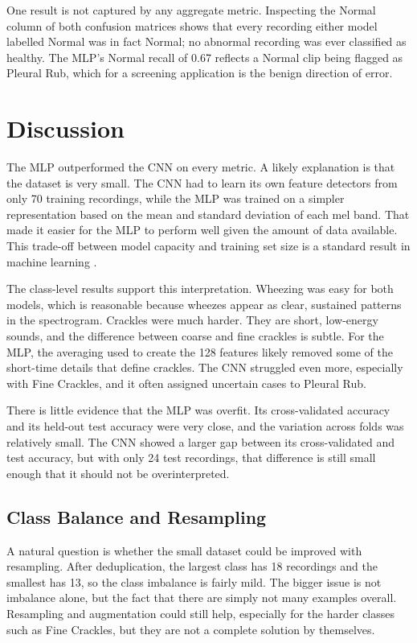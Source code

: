 \documentclass[conference]{IEEEtran}
\begin{document}
One result is not captured by any aggregate metric. Inspecting the Normal column
of both confusion matrices shows that every recording either model labelled
Normal was in fact Normal; no abnormal recording was ever classified as healthy.
The MLP's Normal recall of 0.67 reflects a Normal clip being flagged as Pleural
Rub, which for a screening application is the benign direction of error.

\section{Discussion}
The MLP outperformed the CNN on every metric. A
likely explanation is that the dataset is very small. The CNN had to learn its
own feature detectors from only 70 training recordings, while the MLP was
trained on a simpler representation based on the mean and standard deviation of
each mel band. That made it easier for the MLP to perform well given the amount
of data available. This trade-off between model capacity and training set size
is a standard result in machine learning \cite{b1}.

The class-level results support this interpretation. Wheezing was easy for both
models, which is reasonable because wheezes appear as clear, sustained patterns
in the spectrogram. Crackles were much harder. They are short, low-energy
sounds, and the difference between coarse and fine crackles is subtle. For the
MLP, the averaging used to create the 128 features likely removed some of the
short-time details that define crackles. The CNN struggled even more, especially
with Fine Crackles, and it often assigned uncertain cases to Pleural Rub.

There is little evidence that the MLP was overfit. Its cross-validated accuracy
and its held-out test accuracy were very close, and the variation across folds
was relatively small. The CNN showed a larger gap between its cross-validated
and test accuracy, but with only 24 test recordings, that difference is still
small enough that it should not be overinterpreted.

\subsection{Class Balance and Resampling}
\label{sec:resampling}
A natural question is whether the small dataset could be improved with
resampling. After deduplication, the largest class has 18 recordings and the
smallest has 13, so the class imbalance is fairly mild. The bigger issue is not
imbalance alone, but the fact that there are simply not many examples overall.
Resampling and augmentation could still help, especially for the harder classes
such as Fine Crackles, but they are not a complete solution by themselves.
\end{document}
